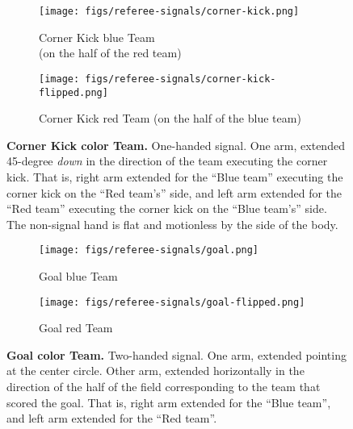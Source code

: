 \begin{figure}[ht!]
    \centering
    \begin{subfigure}{.33\textwidth}
        \centering
        \texttt{[image: figs/referee-signals/corner-kick.png]}
        \caption{{\color{blue}Corner Kick \textlangle{}blue\textrangle{} Team}\\ (on the half of the {\color{red} red} team)}
    \end{subfigure}
    \begin{subfigure}{.33\textwidth}
        \centering
        \texttt{[image: figs/referee-signals/corner-kick-flipped.png]}
        \caption{{\color{red}Corner Kick \textlangle{}red\textrangle{} Team} (on the half of the {\color{blue} blue} team)}
    \end{subfigure}
    \caption{\textbf{Corner Kick \textlangle{}color\textrangle{} Team.} One-handed signal. One arm, extended 45-degree \emph{down} in the direction of the team executing the corner kick. That is, right arm extended for the ``Blue team'' executing the corner kick on the ``Red team's'' side, and left arm extended for the ``Red team'' executing the corner kick on the ``Blue team's'' side. The non-signal hand is flat and motionless by the side of the body.}
\end{figure}
    
\begin{figure}[ht!]
    \centering
    \begin{subfigure}{.33\textwidth}
        \centering
        \texttt{[image: figs/referee-signals/goal.png]}
        \caption{\color{blue}Goal \textlangle{}blue\textrangle{} Team}
    \end{subfigure}
    \begin{subfigure}{.33\textwidth}
        \centering
        \texttt{[image: figs/referee-signals/goal-flipped.png]}
        \caption{\color{red}Goal \textlangle{}red\textrangle{} Team}
    \end{subfigure}
    \caption{\textbf{Goal \textlangle{}color\textrangle{} Team.} Two-handed signal. One arm, extended pointing at the center circle. Other arm, extended horizontally in the direction of the half of the field corresponding to the team that scored the goal. That is, right arm extended for the ``Blue team'', and left arm extended for the ``Red team''.}
\end{figure}

